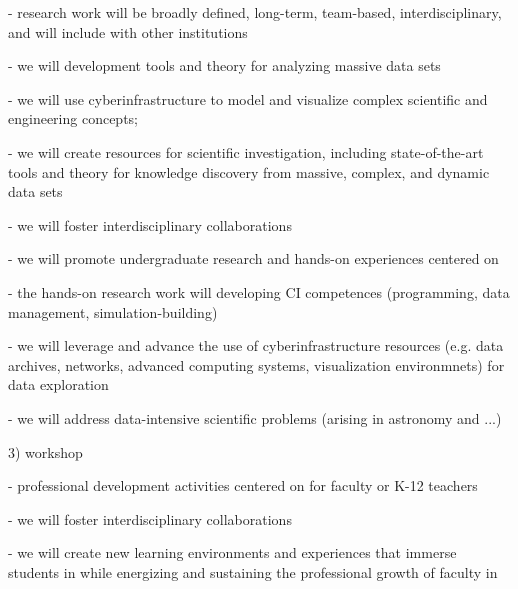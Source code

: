 {{- research work will be broadly defined, long-term, team-based, interdisciplinary, and 
   will include with other institutions 

- we will development tools and theory for analyzing massive data sets

- we will use cyberinfrastructure to model and visualize complex scientific and engineering 
   concepts;

- we will create resources for scientific investigation, including state-of-the-art tools and 
  theory for knowledge discovery from massive, complex, and dynamic data sets

- we will foster interdisciplinary collaborations

- we will promote undergraduate research and hands-on experiences centered on \cdse

- the hands-on research work will developing CI competences (programming, data 
   management, simulation-building)

- we will leverage and advance the use of cyberinfrastructure resources (e.g. data archives, 
   networks, advanced computing systems, visualization environmnets) for data exploration

- we will address data-intensive scientific problems (arising in astronomy and ...)

3) workshop

- professional development activities centered on \cdse for faculty or K-12 teachers

- we will foster interdisciplinary collaborations

- we will create new learning environments and experiences that immerse students in \cdse 
   while energizing and sustaining the professional growth of faculty in \cdse
}
}
